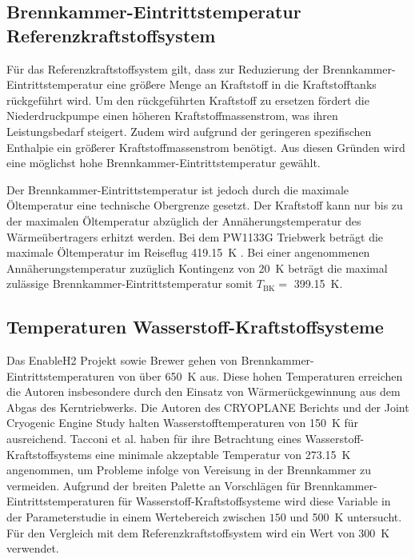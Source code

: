 \subsection{Brennkammer-Eintrittstemperatur Referenzkraftstoffsystem}

Für das Referenzkraftstoffsystem gilt, dass zur Reduzierung der Brennkammer-Eintrittstemperatur eine größere Menge an Kraftstoff in die Kraftstofftanks rückgeführt wird. Um den rückgeführten Kraftstoff zu ersetzen fördert die Niederdruckpumpe einen höheren Kraftstoffmassenstrom, was ihren Leistungsbedarf steigert. Zudem wird aufgrund der geringeren spezifischen Enthalpie ein größerer Kraftstoffmassenstrom benötigt. Aus diesen Gründen wird eine möglichst hohe Brennkammer-Eintrittstemperatur gewählt. 

Der Brennkammer-Eintrittstemperatur ist jedoch durch die maximale Öltemperatur eine technische Obergrenze gesetzt. Der Kraftstoff kann nur bis zu der maximalen Öltemperatur abzüglich der Annäherungstemperatur des Wärmeübertragers erhitzt werden. Bei dem PW1133G Triebwerk beträgt die maximale Öltemperatur im Reiseflug \SI{419.15}{\K} \cite{EASA.2018}. Bei einer angenommenen Annäherungstemperatur zuzüglich Kontingenz von \SI{20}{\K} beträgt die maximal zulässige Brennkammer-Eintrittstemperatur somit $T_\mathrm{BK}=$ \SI{399.15}{\K}.

\subsection{Temperaturen Wasserstoff-Kraftstoffsysteme}

Das EnableH2 Projekt \cite{Patrao.2023} sowie Brewer \cite{Brewer.1991} gehen von Brennkammer-Eintrittstemperaturen von über \SI{650}{\K} aus. Diese hohen Temperaturen erreichen die Autoren insbesondere durch den Einsatz von Wärmerückgewinnung aus dem Abgas des Kerntriebwerks. Die Autoren des CRYOPLANE Berichts \cite{Scholz.2003} und der Joint Cryogenic Engine Study \cite{SIMON.1994} halten Wasserstofftemperaturen von \SI{150}{\K} für ausreichend. Tacconi et al. \cite{Tacconi.2023} haben für ihre Betrachtung eines Wasserstoff-Kraftstoffsystems eine minimale akzeptable Temperatur von \SI{273.15}{\K} angenommen, um Probleme infolge von Vereisung in der Brennkammer zu vermeiden. Aufgrund der breiten Palette an Vorschlägen für Brennkammer-Eintrittstemperaturen für Wasserstoff-Kraftstoffsysteme wird diese Variable in der Parameterstudie in einem Wertebereich zwischen $150$ und \SI{500}{\K} untersucht. Für den Vergleich mit dem Referenzkraftstoffsystem wird ein Wert von \SI{300}{\K} verwendet.

